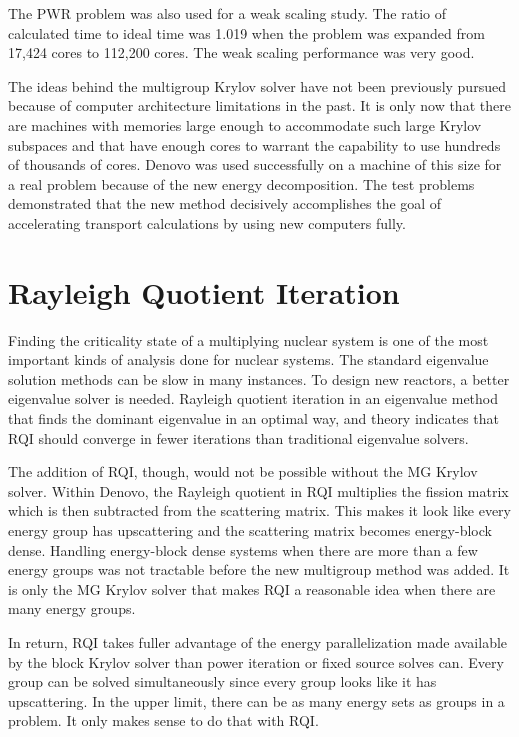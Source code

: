 The PWR problem was also used for a weak scaling study. The ratio of calculated time to ideal time was 1.019 when the problem was expanded from 17,424 cores to 112,200 cores. The weak scaling performance was very good. 

The ideas behind the multigroup Krylov solver have not been previously pursued because of computer architecture limitations in the past. It is only now that there are machines with memories large enough to accommodate such large Krylov subspaces and that have enough cores to warrant the capability to use hundreds of thousands of cores. Denovo was used successfully on a machine of this size for a real problem because of the new energy decomposition. The test problems demonstrated that the new method decisively accomplishes the goal of accelerating transport calculations by using new computers fully.

\section{Rayleigh Quotient Iteration}
Finding the criticality state of a multiplying nuclear system is one of the most important kinds of analysis done for nuclear systems. The standard eigenvalue solution methods can be slow in many instances. To design new reactors, a better eigenvalue solver is needed. Rayleigh quotient iteration in an eigenvalue method that finds the dominant eigenvalue in an optimal way, and theory indicates that RQI should converge in fewer iterations than traditional eigenvalue solvers.

The addition of RQI, though, would not be possible without the MG Krylov solver. Within Denovo, the Rayleigh quotient in RQI multiplies the fission matrix which is then subtracted from the scattering matrix. This makes it look like every energy group has upscattering and the scattering matrix becomes energy-block dense. Handling energy-block dense systems when there are more than a few energy groups was not tractable before the new multigroup method was added. It is only the MG Krylov solver that makes RQI a reasonable idea when there are many energy groups.

In return, RQI takes fuller advantage of the energy parallelization made available by the block Krylov solver than power iteration or fixed source solves can. Every group can be solved simultaneously since every group looks like it has upscattering. In the upper limit, there can be as many energy sets as groups in a problem. It only makes sense to do that with RQI. 

